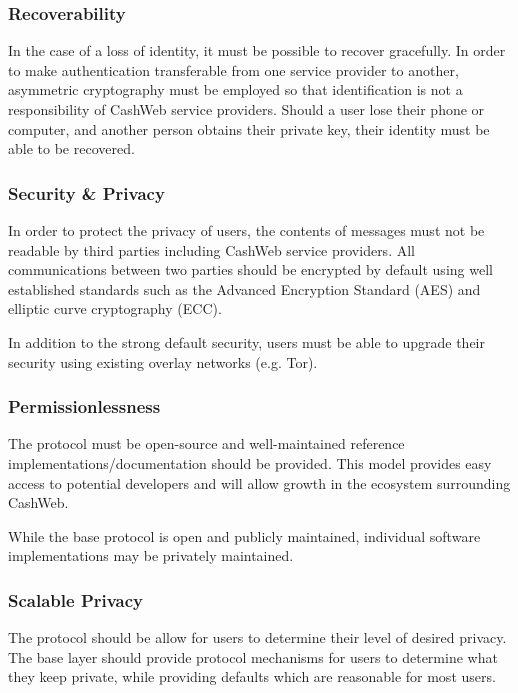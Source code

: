 \documentclass{article}
\begin{document}
\subsubsection{Recoverability}

In the case of a loss of identity, it must be possible to recover gracefully. In order to make authentication transferable from one service provider to another, asymmetric cryptography must be employed so that identification is not a responsibility of CashWeb service providers. Should a user lose their phone or computer, and another person obtains their private key, their identity must be able to be recovered.

\subsubsection{Security \& Privacy}

In order to protect the privacy of users, the contents of messages must not be readable by third parties including CashWeb service providers. All communications between two parties should be encrypted by default using well established standards such as the Advanced Encryption Standard (AES) and elliptic curve cryptography (ECC).

In addition to the strong default security, users must be able to upgrade their security using existing overlay networks (e.g. Tor).

\subsubsection{Permissionlessness}

The protocol must be open-source and well-maintained reference implementations/documentation should be provided. This model provides easy access to potential developers and will allow growth in the ecosystem surrounding CashWeb.

While the base protocol is open and publicly maintained, individual software implementations may be privately maintained.

\subsubsection{Scalable Privacy}

The protocol should be allow for users to determine their level of desired privacy. The base layer should provide protocol mechanisms for users to determine what they keep private, while providing defaults which are reasonable for most users.
\end{document}
